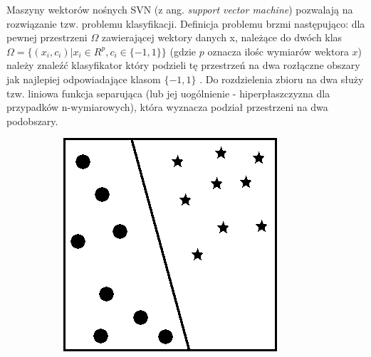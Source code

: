 Maszyny wektorów nośnych SVN (z ang. \textit{support vector machine}) pozwalają na rozwiązanie tzw. problemu klasyfikacji. Definicja problemu brzmi następująco: dla pewnej przestrzeni $\Omega$ zawierającej wektory danych x, należące do dwóch klas
$\Omega = \{(x_{i}, c_{i}) | x_{i} \in R^p, c_{i} \in \{-1,1\}\}$
(gdzie $p$ oznacza ilośc wymiarów wektora $x$) należy znaleźć klasyfikator który podzieli tę przestrzeń na dwa rozłączne obszary jak najlepiej
odpowiadające klasom $\{-1, 1\}$ \cite{stefanowski2010}. Do rozdzielenia zbioru na dwa służy tzw. liniowa funkcja separująca
(lub jej uogólnienie - hiperpłaszczyzna dla przypadków n-wymiarowych), która wyznacza podział przestrzeni na dwa podobszary.

\begin{figure}[h!]
    \begin{subfigure}[b]{0.33\textwidth}
        \includegraphics[width=\linewidth]{img/granica_1.jpg}
    \end{subfigure}%
    \begin{subfigure}[b]{0.33\textwidth}

\end{subfigure}
\end{figure}
